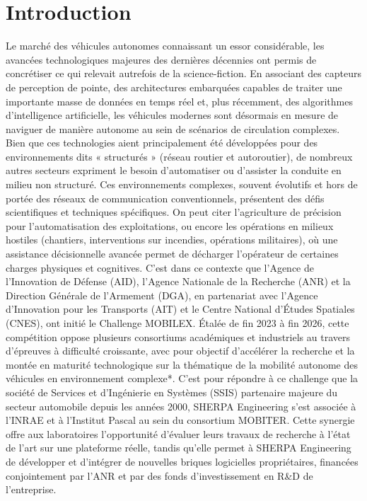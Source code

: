\section*{Introduction}
Le marché des véhicules autonomes connaissant un essor considérable, les avancées technologiques majeures des dernières décennies ont permis de concrétiser ce qui relevait autrefois de la science-fiction. En associant des capteurs de perception de pointe, des architectures embarquées capables de traiter une importante masse de données en temps réel et, plus récemment, des algorithmes d'intelligence artificielle, les véhicules modernes sont désormais en mesure de naviguer de manière autonome au sein de scénarios de circulation complexes.\\

\indent Bien que ces technologies aient principalement été développées pour des environnements dits « structurés » (réseau routier et autoroutier), de nombreux autres secteurs expriment le besoin d'automatiser ou d'assister la conduite en milieu non structuré. Ces environnements complexes, souvent évolutifs et hors de portée des réseaux de communication conventionnels, présentent des défis scientifiques et techniques spécifiques. On peut citer l'agriculture de précision pour l'automatisation des exploitations, ou encore les opérations en milieux hostiles (chantiers, interventions sur incendies, opérations militaires), où une assistance décisionnelle avancée permet de décharger l'opérateur de certaines charges physiques et cognitives. C'est dans ce contexte que l'Agence de l'Innovation de Défense (AID), l'Agence Nationale de la Recherche (ANR) et la Direction Générale de l'Armement (DGA), en partenariat avec l'Agence d'Innovation pour les Transports (AIT) et le Centre National d'Études Spatiales (CNES), ont initié le Challenge MOBILEX. Étalée de fin 2023 à fin 2026, cette compétition oppose plusieurs consortiums académiques et industriels au travers d'épreuves à difficulté croissante, avec pour objectif d'accélérer la recherche et la montée en maturité technologique sur la thématique de la mobilité autonome des véhicules en environnement complexe*. 
C'est pour répondre à ce challenge que la société de Services et d'Ingénierie en Systèmes (SSIS) partenaire majeure du secteur automobile depuis les années 2000, SHERPA Engineering s'est associée à l'INRAE et à l'Institut Pascal au sein du consortium MOBITER. Cette synergie offre aux laboratoires l'opportunité d'évaluer leurs travaux de recherche à l'état de l'art sur une plateforme réelle, tandis qu'elle permet à SHERPA Engineering de développer et d'intégrer de nouvelles briques logicielles propriétaires, financées conjointement par l'ANR et par des fonds d'investissement en R&D de l'entreprise.\\

